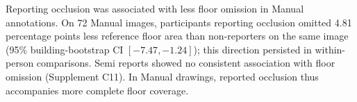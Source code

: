 Reporting occlusion was associated with less floor omission in Manual annotations. On 72 Manual images, participants reporting occlusion omitted 4.81 percentage points less reference floor area than non-reporters on the same image (95\% building-bootstrap CI $[-7.47,-1.24]$); this direction persisted in within-person comparisons. Semi reports showed no consistent association with floor omission (Supplement C11). In Manual drawings, reported occlusion thus accompanies more complete floor coverage.

